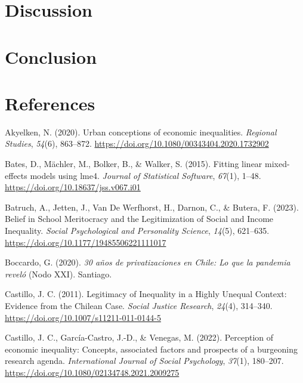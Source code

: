 \documentclass[
  12pt,
]{article}
\newlength{\cslhangindent}
\newenvironment{CSLReferences}[2] %
 {\begin{list}{}{%
  \setlength{\itemindent}{0pt}
  \setlength{\leftmargin}{0pt}
  \setlength{\parsep}{0pt}
  \ifodd #1
   \setlength{\leftmargin}{\cslhangindent}
   \setlength{\itemindent}{-1\cslhangindent}
  \fi
  \setlength{\itemsep}{#2\baselineskip}}}
 {\end{list}}
\begin{document}
\section{Discussion}\label{discussion}

\section{Conclusion}\label{conclusion}

\section{References}\label{references}

\label{refs}
\begin{CSLReferences}{1}{0}
Akyelken, N. (2020). Urban conceptions of economic inequalities.
\emph{Regional Studies}, \emph{54}(6), 863--872.
\url{https://doi.org/10.1080/00343404.2020.1732902}

Bates, D., Mächler, M., Bolker, B., \& Walker, S. (2015). Fitting linear
mixed-effects models using {lme4}. \emph{Journal of Statistical
Software}, \emph{67}(1), 1--48.
\url{https://doi.org/10.18637/jss.v067.i01}

Batruch, A., Jetten, J., Van De Werfhorst, H., Darnon, C., \& Butera, F.
(2023). Belief in {School Meritocracy} and the {Legitimization} of
{Social} and {Income Inequality}. \emph{Social Psychological and
Personality Science}, \emph{14}(5), 621--635.
\url{https://doi.org/10.1177/19485506221111017}

Boccardo, G. (2020). \emph{30 a{ñ}os de privatizaciones en {Chile}: Lo
que la pandemia revel{ó}} (Nodo XXI). Santiago.

Castillo, J. C. (2011). Legitimacy of {Inequality} in a {Highly Unequal
Context}: {Evidence} from the {Chilean Case}. \emph{Social Justice
Research}, \emph{24}(4), 314--340.
\url{https://doi.org/10.1007/s11211-011-0144-5}

Castillo, J. C., García-Castro, J.-D., \& Venegas, M. (2022). Perception
of economic inequality: Concepts, associated factors and prospects of a
burgeoning research agenda. \emph{International Journal of Social
Psychology}, \emph{37}(1), 180--207.
\url{https://doi.org/10.1080/02134748.2021.2009275}


\end{CSLReferences}
\end{document}
